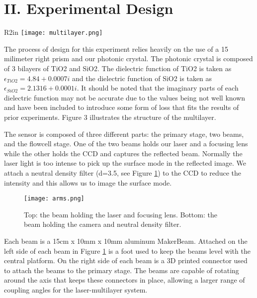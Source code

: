 \section*{\textbf{II. Experimental Design}}

\begin{wrapfigure}{R}{2in}
    \texttt{[image: multilayer.png]}
    \caption{An illustration of the photonic crystal used in our sensor}
    \label{fig:multilayer}
\end{wrapfigure}
\hspace{0.15in}
The process of design for this experiment relies heavily on the use of a 15 milimeter right prism and our photonic crystal. The photonic crystal is composed of 3 bilayers of TiO2 and SiO2. The dielectric function of TiO2 is taken as $\epsilon_{TiO2} = 4.84 + 0.0007i$ and the dielectric function of SiO2 is taken as $\epsilon_{SiO2} = 2.1316 + 0.0001i$. It should be noted that the imaginary parts of each dielectric function may not be accurate due to the values being not well known and have been included to introduce some form of loss that fits the results of prior experiments. Figure 3 illustrates the structure of the multilayer.


The sensor is composed of three different parts: the primary stage, two beams, and the flowcell stage.  One of the two beams holds our laser and a focusing lens while the other holds the CCD and captures the reflected beam. Normally the laser light is too intense to pick up the surface mode in the reflected image. We attach a neutral density filter (d=3.5, see Figure \ref{fig:beams}) to the CCD to reduce the intensity and this allows us to image the surface mode. 

\begin{figure}[h]
    \begin{center}
    \texttt{[image: arms.png]}
    \caption{Top: the beam holding the laser and focusing lens. Bottom: the beam holding the camera and neutral density filter.}
    \label{fig:beams}
    \end{center}
\end{figure}

Each beam is a 15cm x 10mm x 10mm aluminum MakerBeam. Attached on the left side of each beam in Figure \ref{fig:beams} is a foot used to keep the beams level with the central platform. On the right side of each beam is a 3D printed connector used to attach the beams to the primary stage. The beams are capable of rotating around the axis that keeps these connectors in place, allowing a larger range of coupling angles for the laser-multilayer system.


